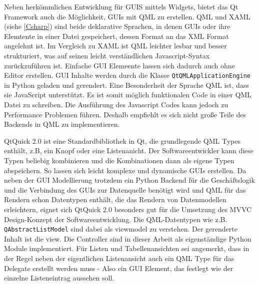 Neben herkömmlichen Entwicklung für GUIS mittels Widgets,  bietet das Qt Framework auch die Möglichkeit, GUIs mit QML zu erstellen.
QML und XAML (siehe \ref{Csharp}) sind beide deklarative Sprachen, in denen GUIs oder ihre Elemtente in einer Datei gespeichert,
dessen Format an das XML Format angelehnt ist.
Im Vergleich zu XAML ist QML leichter lesbar und besser strukturiert, was auf seinen leicht verständlichen Javascript-Syntax zurückzuführen ist.
Einfache GUI Elemeente lassen sich dadurch auch ohne Editor erstellen.
GUI Inhalte werden durch die Klasse \verb|QtQMLApplicationEngine| in Python geladen und gerendert. 
Eine Besonderheit der Sprache QML ist, dass sie JavaScript unterstützt. Es ist somit möglich funktionalen Code in einer QML Datei zu schreiben. 
Die Ausführung des Javascript Codes kann jedoch zu Performance Problemen führen. 
Deshalb empfiehlt es sich nicht große Teile des Backends in QML zu implementieren.

QtQuick 2.0 ist eine Standardbibliothek in Qt, die grundlegende QML Types enthält, z.B, ein Knopf oder eine Listenanicht.
Der Softwareentwickler kann diese Typen beliebig kombinieren und die Kombinationen dann als eigene Typen abspeichern. 
So lassen sich leicht komplexe und dynamische GUIs erstellen. 
Da neben der GUI Modellierung trotzdem ein Python Backend für die Geschäftslogik und die Verbindung des GUIs zur Datenquelle benötigt wird 
und QML für das Rendern schon Datentypen enthält, die das Rendern von Datenmodellen erleichtern, 
eignet sich QtQuick 2.0 besonders gut für die Umsetzung des MVVC Design-Konzept der Softwareentwicklung.
Die QML-Datentypen wie z.B. \verb|QAbstractListModel| sind dabei als viewmodel zu verstehen. Der gerenderte Inhalt ist die view.
Die Controller sind in dieser Arbeit als eigenständige Python Module implementiert.
Für Listen und Tabellenansichten sei angemerkt, dass in der Regel neben der eigentlichen Listenansicht auch ein QML Type für das Delegate 
erstellt werden muss - Also ein GUI Element, das festlegt wie der einzelne Listeneintrag aussehen soll.